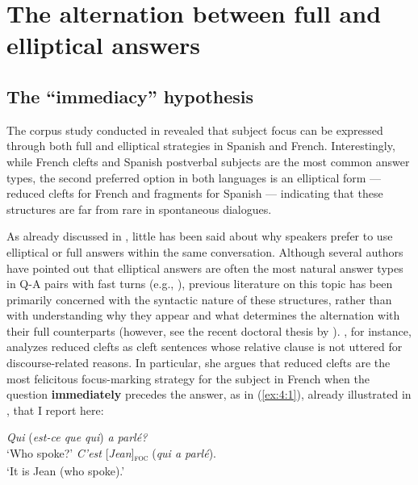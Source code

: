 
\chapter{The alternation between full and elliptical answers}\label{sec:4}

\section{The ``immediacy” hypothesis} 

The corpus study conducted in  revealed that subject focus can be expressed through both full and elliptical strategies in Spanish and French. Interestingly, while French clefts and Spanish postverbal subjects are the most common answer types, the second preferred option in both languages is an elliptical form — reduced clefts for French and fragments for Spanish — indicating that these structures are far from rare in spontaneous dialogues. 

As already discussed in , little has been said about why speakers prefer to use elliptical or full answers within the same conversation. 
Although several authors have pointed out that elliptical answers are often the most natural answer types in Q-A pairs with fast turns (e.g., \cite{belletti2005answering, belletti2008answering, lahousse2012word, vidal2019nota}), previous literature on this topic has been primarily concerned with the syntactic nature of these  structures, rather than with understanding why they appear and what determines the alternation with their full counterparts (however, see the recent doctoral thesis by \cite{bourgoin2022corpus}). 
\textcite{belletti2008cp}, for instance, analyzes reduced clefts as cleft sentences whose relative clause is not uttered for discourse-related reasons. In particular, she argues that reduced clefts are the most felicitous focus-marking strategy for the subject in French when the question \textbf{immediately} precedes the answer, as in (\ref{ex:4:1}), already illustrated in , that I report here:

\begin{exe}
	\ex \label{ex:4:1}
	\begin{xlist}
		\ex \textit{Qui} (\textit{est-ce que qui}) \textit{a parlé?}\\
		`Who spoke?'
		\ex \textit{C'est} {[\textit{Jean}]\textsubscript{\textsc{foc}}} \normalsize(\textit{qui a parlé}).\\
		`It is Jean (who spoke).' \hfill \parencite[192]{belletti2008cp}   
	\end{xlist}
\end{exe} 


